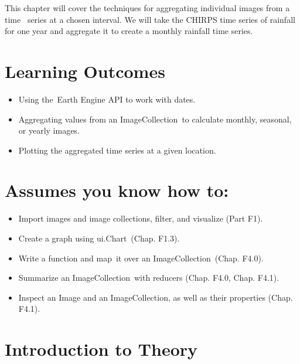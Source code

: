 \documentclass[
  letterpaper,
  DIV=11,
  numbers=noendperiod]{scrreprt}
\providecommand{\tightlist}{%
  \setlength{\itemsep}{0pt}\setlength{\parskip}{0pt}}\usepackage{longtable,booktabs,array}
\begin{document}
This chapter will cover the techniques for aggregating individual images
from a time ~series at a chosen interval. We will take the CHIRPS time
series of rainfall for one year and aggregate it to create a monthly
rainfall time series.

\hypertarget{learning-outcomes-9}{%
\section*{Learning Outcomes}\label{learning-outcomes-9}}


\begin{itemize}
\tightlist
\item
  Using the~Earth Engine API to work with dates.
\item
  Aggregating values from an ImageCollection~to calculate monthly,
  seasonal, or yearly images.
\item
  Plotting the aggregated time series at a given location.
\end{itemize}

\hypertarget{assumes-you-know-how-to-9}{%
\section*{Assumes you know how to:}\label{assumes-you-know-how-to-9}}


\begin{itemize}
\tightlist
\item
  Import images and image collections, filter, and visualize (Part F1).
\item
  \hspace{0pt}\hspace{0pt}Create a graph using ui.Chart~(Chap. F1.3).
\item
  Write a function and map~it over an ImageCollection~(Chap. F4.0).
\item
  Summarize an ImageCollection~with reducers (Chap. F4.0, Chap. F4.1).
\item
  Inspect an Image and an ImageCollection, as well as their properties
  (Chap. F4.1).
\end{itemize}

\hypertarget{introduction-to-theory-4}{%
\section*{Introduction to Theory}\label{introduction-to-theory-4}}
\end{document}
